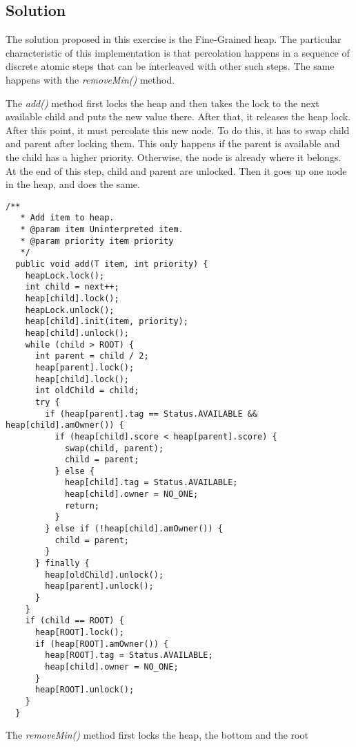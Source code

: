 \subsection{Solution}
\par
The solution proposed in this exercise is the Fine-Grained heap. The particular
characteristic of this implementation is that percolation happens in a sequence
of discrete atomic steps that can be interleaved with other such steps. The same
happens with the \textit{removeMin()} method.
\par
The \textit{add()} method first locks the heap and then takes the lock to the
next available child and puts the new value there. After that, it releases the
heap lock. After this point, it must percolate this new node. To do this, it has
to swap child and parent after locking them. This only happens if the parent is
available and the child has a higher priority. Otherwise, the node is already
where it belongs. At the end of this step, child and parent are unlocked. Then
it goes up one node in the heap, and does the same.
\par
\hfill
\begin{lstlisting}[style=numbers]
  /**
   * Add item to heap.
   * @param item Uninterpreted item.
   * @param priority item priority
   */
  public void add(T item, int priority) {
    heapLock.lock();
    int child = next++;
    heap[child].lock();
    heapLock.unlock();
    heap[child].init(item, priority);
    heap[child].unlock();
    while (child > ROOT) {
      int parent = child / 2;
      heap[parent].lock();
      heap[child].lock();
      int oldChild = child;
      try {
        if (heap[parent].tag == Status.AVAILABLE && heap[child].amOwner()) {
          if (heap[child].score < heap[parent].score) {
            swap(child, parent);
            child = parent;
          } else {
            heap[child].tag = Status.AVAILABLE;
            heap[child].owner = NO_ONE;
            return;
          }
        } else if (!heap[child].amOwner()) {
          child = parent;
        }
      } finally {
        heap[oldChild].unlock();
        heap[parent].unlock();
      }
    }
    if (child == ROOT) {
      heap[ROOT].lock();
      if (heap[ROOT].amOwner()) {
        heap[ROOT].tag = Status.AVAILABLE;
        heap[child].owner = NO_ONE;
      }
      heap[ROOT].unlock();
    }
  }

\end{lstlisting}
\hfill
\par
The \textit{removeMin()} method first locks the heap, the bottom and the root
